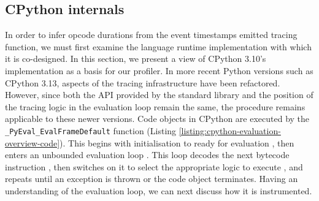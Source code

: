 \subsection{CPython internals}
\label{ssec:profiling-bytecode-cpython-internals}

In order to infer opcode durations from the event timestamps emitted tracing function, we must first examine the language runtime implementation with which it is co-designed. In this section, we present a view of CPython 3.10's implementation as a basis for our profiler.
In more recent Python versions such as CPython 3.13, aspects of the tracing infrastructure have been refactored. However, since both the API provided by the standard library and the position of the tracing logic in the evaluation loop remain the same, the procedure remains applicable to these newer versions.
Code objects in CPython are executed by the \texttt{\_PyEval\_EvalFrameDefault} function (Listing \ref{listing:cpython-evaluation-overview-code}). This begins with initialisation to ready for evaluation , then enters an unbounded evaluation loop . This loop decodes the next bytecode instruction , then switches on it to select the appropriate logic to execute , and repeats until an exception is thrown or the code object terminates.
Having an understanding of the evaluation loop, we can next discuss how it is instrumented. %

